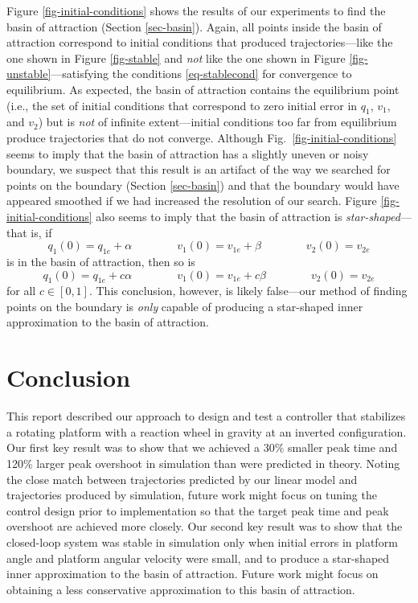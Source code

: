 \documentclass[conf]{new-aiaa}
\begin{document}
Figure \ref{fig-initial-conditions} shows the results of our experiments to find the basin of attraction (Section \ref{sec-basin}). Again, all points inside the basin of attraction correspond to initial conditions that produced trajectories---like the one shown in Figure \ref{fig-stable} and {\em not} like the one shown in Figure \ref{fig-unstable}---satisfying the conditions \eqref{eq-stablecond} for convergence to equilibrium.
As expected, the basin of attraction contains the equilibrium point (i.e., the set of initial conditions that correspond to zero initial error in $q_{1}$, $v_{1}$, and $v_{2}$) but is {\em not} of infinite extent---initial conditions too far from equilibrium produce trajectories that do not converge.
Although Fig.~\ref{fig-initial-conditions} seems to imply that the basin of attraction has a slightly uneven or noisy boundary, we suspect that this result is an artifact of the way we searched for points on the boundary (Section \ref{sec-basin}) and that the boundary would have appeared smoothed if we had increased the resolution of our search.
Figure \ref{fig-initial-conditions} also seems to imply that the basin of attraction is {\em star-shaped}---that is, if
\begin{equation}
q_{1}(0) = q_{1e} + \alpha
\qquad\qquad
v_{1}(0) = v_{1e} + \beta
\qquad\qquad
v_{2}(0) = v_{2e}
\end{equation}
is in the basin of attraction, then so is
\begin{equation}
q_{1}(0) = q_{1e} + c\alpha
\qquad\qquad
v_{1}(0) = v_{1e} + c\beta
\qquad\qquad
v_{2}(0) = v_{2e}
\end{equation}
for all $c\in[0, 1]$. This conclusion, however, is likely false---our method of finding points on the boundary is {\em only} capable of producing a star-shaped inner approximation to the basin of attraction.


\section{Conclusion}
\label{sec-conclusion}

This report described our approach to design and test a controller that stabilizes a rotating platform with a reaction wheel in gravity at an inverted configuration.
Our first key result was to show that we achieved a 30\% smaller peak time and 120\% larger peak overshoot in simulation than were predicted in theory. Noting the close match between trajectories predicted by our linear model and trajectories produced by simulation, future work might focus on tuning the control design prior to implementation so that the target peak time and peak overshoot are achieved more closely.
Our second key result was to show that the closed-loop system was stable in simulation only when initial errors in platform angle and platform angular velocity were small, and to produce a star-shaped inner approximation to the basin of attraction. Future work might focus on obtaining a less conservative approximation to this basin of attraction.
\end{document}
